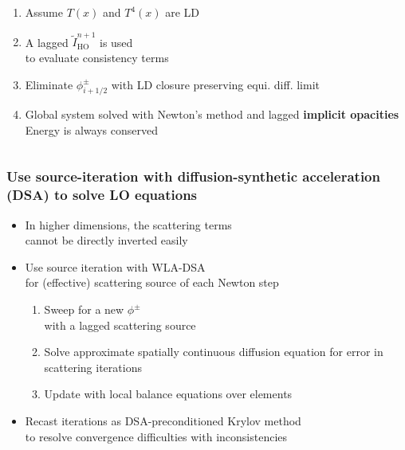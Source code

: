 \documentclass[xcolor=dvipsnames,hyperref={pdfpagelabels=false},unknownkeysallowed,
handout]{beamer}
\newcommand{\colb}[1]{{\color{blue} #1}}
\newcommand{\colG}[1]{{\color{Gray!110} #1}}
\newlength{\wideitemsep}
\let\olditem\item
\renewcommand{\item}{\setlength{\itemsep}{\wideitemsep}\olditem}
\newcommand{\mom}[1]{\langle #1 \rangle}
\begin{document}
\begin{frame}
\begin{columns}
\begin{column}{0.75\linewidth}
    \begin{enumerate}
        \item Assume $T(x)$ and $T^4(x)$ are LD 
        \item A lagged \colb{ $\tilde{I}_{\text{HO}}^{n+1}$} is used \\ to evaluate
        consistency terms 
        \item Eliminate $\phi_{i+1/2}^\pm$ with LD closure
            \colG{preserving equi. diff. limit}
            \begin{center}{\textcolor{Gray}{%
                    \fbox{ {\color{black} $\displaystyle  
      \phi_{i+1/2}^+ = 2\mom{\phi}_{R,i}^+ - \mom{\phi}_{L,i}^+$}}}}
            \end{center}
       \item Global system solved with Newton's method and lagged \textbf{implicit
           opacities}\\ \colG{Energy is always conserved}
       \end{enumerate}
    \end{column}
\end{columns}
\end{frame}

\begin{frame}
    \frametitle{Use source-iteration with diffusion-synthetic acceleration (DSA) to
    solve LO equations}
    \begin{itemize}
        \item[] In higher dimensions, the scattering terms \\ cannot be directly
            inverted easily
        \item[] Use source iteration with WLA-DSA \\ \colG{for (effective) scattering source
            of each Newton step}
            \begin{enumerate}
                \item Sweep for a new $\phi^{\pm}$ \\ \colG{with a lagged scattering
                    source}
                \item Solve approximate \colb{spatially continuous} diffusion equation for error in
                    scattering iterations
                \item Update with local balance equations over elements
            \end{enumerate}
            \pause
        \item[] Recast iterations as DSA-preconditioned Krylov method \\
            \colG{to resolve convergence difficulties with inconsistencies}
    \end{itemize}

\end{frame}
\end{document}
